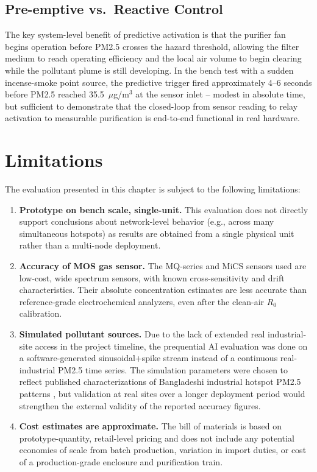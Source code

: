 \subsection{Pre-emptive vs.\ Reactive Control}
The key system-level benefit of predictive activation is that the purifier fan begins operation before PM2.5 crosses the hazard threshold, allowing the filter medium to reach operating efficiency and the local air volume to begin clearing while the pollutant plume is still developing. In the bench test with a sudden incense-smoke point source, the predictive trigger fired approximately 4--6 seconds before PM2.5 reached 35.5~$\mu$g/m$^3$ at the sensor inlet -- modest in absolute time, but sufficient to demonstrate that the closed-loop from sensor reading to relay activation to measurable purification is end-to-end functional in real hardware.

\section{Limitations}
\label{sec:exp-limitations}

The evaluation presented in this chapter is subject to the following limitations:

\begin{enumerate}
   \item \textbf{Prototype on bench scale, single-unit.} This evaluation does not directly support conclusions about network-level behavior (e.g., across many simultaneous hotspots) as results are obtained from a single physical unit rather than a multi-node deployment.
    \item \textbf{Accuracy of MOS gas sensor.} The MQ-series and MiCS sensors used are low-cost, wide spectrum sensors, with known cross-sensitivity and drift characteristics. Their absolute concentration estimates are less accurate than reference-grade electrochemical analyzers, even after the clean-air $R_0$ calibration.
    \item \textbf{Simulated pollutant sources.} Due to the lack of extended real industrial-site access in the project timeline, the prequential AI evaluation was done on a software-generated sinusoidal+spike stream instead of a continuous real-industrial PM2.5 time series. The simulation parameters were chosen to reflect published characterizations of Bangladeshi industrial hotspot PM2.5 patterns \citep{basak2025spatial,ali2025longterm}, but validation at real sites over a longer deployment period would strengthen the external validity of the reported accuracy figures.
    \item \textbf{Cost estimates are approximate.} The bill of materials is based on prototype-quantity, retail-level pricing and does not include any potential economies of scale from batch production, variation in import duties, or cost of a production-grade enclosure and purification train.
\end{enumerate}

